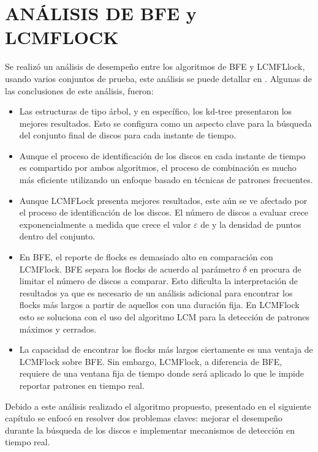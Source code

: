 \section{ANÁLISIS DE BFE y LCMFLOCK}

Se realizó un análisis de desempeño entre los algoritmos de BFE y LCMFLlock, usando varios 
conjuntos de prueba, este análisis se puede detallar en \cite{cabrera}. Algunas de las 
conclusiones de este análisis, fueron:

\begin{itemize}
\item Las estructuras de tipo árbol, y en específico, los kd-tree presentaron los mejores 
resultados. Esto se configura
como un aspecto clave para la búsqueda del conjunto final
de discos para cada instante de tiempo. 

 \item Aunque el proceso de identificación de los discos en cada
instante de tiempo es compartido por ambos algoritmos, el
proceso de combinación es mucho más eficiente utilizando
un enfoque basado en técnicas de patrones frecuentes.

\item Aunque LCMFLock presenta mejores resultados, este
aún se ve afectado por el proceso de identificación de los
discos. El número de discos a evaluar crece exponencialmente a medida que crece el valor $\varepsilon$ de y la 
densidad de puntos dentro del conjunto.

\item En BFE, el reporte de flocks es demasiado alto en
comparación con LCMFlock. BFE separa los
flocks de acuerdo al parámetro $\delta$ en procura de limitar
el número de discos a comparar. Esto dificulta la interpretación de resultados ya que es necesario 
de un análisis adicional para encontrar los flocks más largos a partir de
aquellos con una duración fija. En LCMFlock esto se
soluciona con el uso del algoritmo LCM para la detección
de patrones máximos y cerrados.

\item La capacidad de encontrar los flocks más largos ciertamente es una ventaja de LCMFlock sobre 
BFE. Sin embargo, LCMFlock, a diferencia de BFE, requiere de
una ventana fija de tiempo donde será aplicado lo que
le impide reportar patrones en tiempo real. 
\end{itemize}

Debido a este análisis realizado el algoritmo propuesto, presentado en el siguiente capítulo se 
enfocó en resolver dos problemas claves: mejorar el desempeño
durante la búsqueda de los discos e implementar mecanismos de detección en tiempo real.




